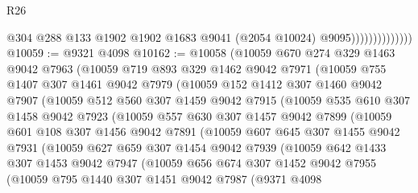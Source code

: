 \begin{lexlean}{R26}
\begin{coremodule}
                                @304
                                @288
                                @133
                                @1902
                                @1902
                                @1683
                                @9041
                                (@2054 @10024)
                                @9095))))))))))))))
@10059 := @9321 @4098
@10162 := @10058
    (@10059
      @670
      @274
      @329
      @1463
      @9042
      @7963
      (@10059
        @719
        @893
        @329
        @1462
        @9042
        @7971
        (@10059
          @755
          @1407
          @307
          @1461
          @9042
          @7979
          (@10059
            @152
            @1412
            @307
            @1460
            @9042
            @7907
            (@10059
              @512
              @560
              @307
              @1459
              @9042
              @7915
              (@10059
                @535
                @610
                @307
                @1458
                @9042
                @7923
                (@10059
                  @557
                  @630
                  @307
                  @1457
                  @9042
                  @7899
                  (@10059
                    @601
                    @108
                    @307
                    @1456
                    @9042
                    @7891
                    (@10059
                      @607
                      @645
                      @307
                      @1455
                      @9042
                      @7931
                      (@10059
                        @627
                        @659
                        @307
                        @1454
                        @9042
                        @7939
                        (@10059
                          @642
                          @1433
                          @307
                          @1453
                          @9042
                          @7947
                          (@10059
                            @656
                            @674
                            @307
                            @1452
                            @9042
                            @7955
                            (@10059
                              @795
                              @1440
                              @307
                              @1451
                              @9042
                              @7987
                              (@9371
                                @4098

\end{coremodule}
\end{lexlean}
